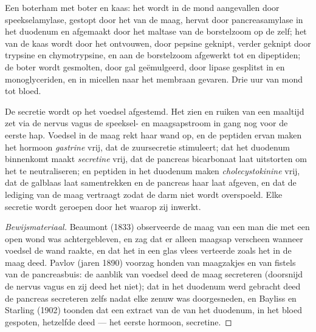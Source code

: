 \begin{example}\label{ex:b1:digestion-absorption:meal}
Een boterham met boter en kaas: het  wordt in de mond aangevallen
door speekselamylase, gestopt door het  van de maag, hervat door
pancreasamylase in het duodenum en afgemaakt door het maltase van de
borstelzoom op de  zelf; het  van de kaas wordt door het
 ontvouwen, door pepsine geknipt, verder geknipt door trypsine en
chymotrypsine, en aan de borstelzoom afgewerkt tot  en
dipeptiden; de boter wordt gesmolten, door gal geëmulgeerd, door lipase
gesplitst in  en monoglyceriden, en in micellen naar het membraan
gevaren. Drie uur van mond tot bloed.
\end{example}

\begin{proposition}\label{prop:b1:digestion-absorption:control}
De secretie wordt op het voedsel afgestemd. Het zien en ruiken van een
maaltijd zet via de nervus vagus de speeksel- en maagsapstroom in gang nog
voor de eerste hap. Voedsel in de maag rekt haar wand op, en de peptiden
ervan maken het hormoon \emph{gastrine} vrij, dat de zuursecretie
stimuleert;  dat het duodenum binnenkomt maakt \emph{secretine} vrij,
dat de pancreas bicarbonaat laat uitstorten om het te neutraliseren; 
en peptiden in het duodenum maken \emph{cholecystokinine} vrij, dat de
galblaas laat samentrekken en de pancreas haar  laat afgeven, en
dat de lediging van de maag vertraagt zodat de darm niet wordt overspoeld.
Elke secretie wordt geroepen door het  waarop zij inwerkt.
\end{proposition}
\begin{proof}[Bewijsmateriaal]
Beaumont (1833) observeerde de maag van een man die met een open wond was
achtergebleven, en zag dat er alleen maagsap verscheen wanneer voedsel de
wand raakte, en dat het in een glas vlees verteerde zoals het in de maag
deed. Pavlov (jaren 1890) voorzag honden van maagzakjes en van fistels van
de pancreasbuis: de aanblik van voedsel deed de maag secreteren (doorsnijd
de nervus vagus en zij deed het niet);  dat in het duodenum werd
gebracht deed de pancreas secreteren zelfs nadat elke zenuw was
doorgesneden, en Bayliss en Starling (1902) toonden dat een extract van de
 van het duodenum, in het bloed gespoten, hetzelfde deed --- het
eerste hormoon, secretine.
\end{proof}

